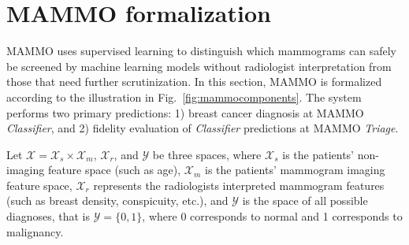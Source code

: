 \documentclass[journal]{IEEEtran}
\begin{document}
% 
% 
% 
% 

 


\section{MAMMO formalization} 

MAMMO uses supervised learning to distinguish which mammograms can safely be screened by machine learning models without radiologist interpretation from those that need further scrutinization.  In this section, MAMMO is formalized according to the illustration in Fig.~\ref{fig:mammocomponents}. The system performs two primary predictions: 1) breast cancer diagnosis at MAMMO \textit{Classifier}, and 2)  fidelity evaluation of \textit{Classifier} predictions at MAMMO \textit{Triage}.

Let  $\mathcal{X} = \mathcal{X}_s \times \mathcal{X}_m$, $\mathcal{X}_r$, and $\mathcal{Y}$  be three spaces, where  $\mathcal{X}_s$ is the patients' non-imaging feature space (such as age), $\mathcal{X}_m$ is the patients' mammogram imaging feature space, $\mathcal{X}_r$ represents the radiologists interpreted mammogram features (such as breast density, conspicuity, etc.), and $\mathcal{Y}$ is the space of all possible diagnoses, that is $\mathcal{Y} = \{0,1\}$, where 0 corresponds to normal and 1 corresponds to malignancy.   
\end{document}
